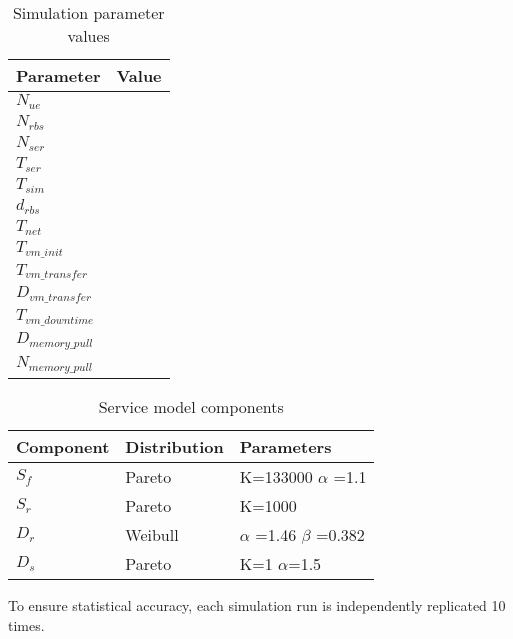 \begin{table}[tb]
 	\centering
 	
    \begin{tabular}{|l|l|} \hline
    	\textbf{Parameter}    	& \textbf{Value} \\ \hline
    	$N_{ue}$						& \\ \hline
    	$N_{rbs}$						& \\ \hline
    	$N_{ser}$						& \\ \hline
    	$T_{ser}$						& \\ \hline
    	$T_{sim}$						& \\ \hline
    	$d_{rbs}$						& \\ \hline
    	$T_{net}$						& \\ \hline
        $T_{vm\_init}$				& \\ \hline
        $T_{vm\_transfer}$		& \\ \hline
		$D_{vm\_transfer}$		& \\ \hline
		$T_{vm\_downtime}$	& \\ \hline
		$D_{memory\_pull}$	& \\ \hline
		$N_{memory\_pull}$	& \\ \hline
    \end{tabular}
    
    \caption{Simulation parameter values}
    \label{table:simulation_parameters}
\end{table}

\begin{table}[tb]
	\centering
	
    \begin{tabular}{|l|l|l|}\hline
    	\textbf{Component}  	& \textbf{Distribution} 	& \textbf{Parameters}     \\ \hline
    	$S_f$   & Pareto   				& K=133000 $\alpha$ =1.1  \\ \hline
    	$S_r$   & Pareto    				& K=1000         \\ \hline
    	$D_r$ 	& Weibull    				& $\alpha$ =1.46 $\beta$ =0.382 \\ \hline
    	$D_s$ 	& Pareto     				& K=1 $\alpha$=1.5      \\ \hline
    \end{tabular}
    
    \caption{Service model components}
    \label{table:traffic_parameters}
\end{table}

To ensure statistical accuracy, each simulation run is independently replicated 10 times.